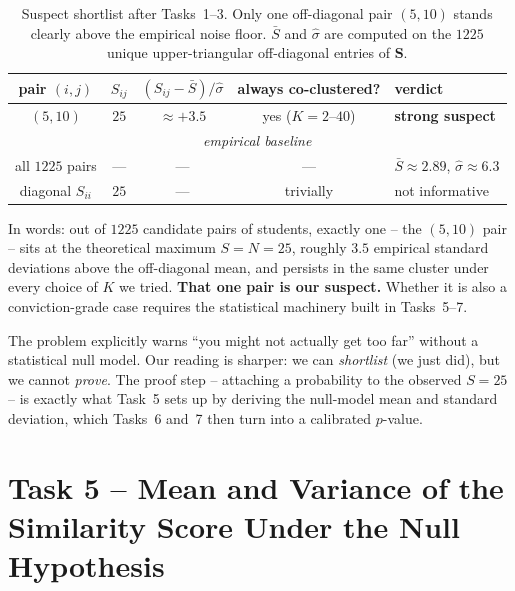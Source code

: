 \documentclass[11pt,a4paper]{article}
\newcommand{\Sm}{\bm{S}}
\begin{document}
\begin{table}[htb]
  \centering
  \begin{tabular}{c c c c l}
    \toprule
    pair $(i,j)$ & $S_{ij}$ & $(S_{ij}-\bar S)/\hat\sigma$ &
        always co-clustered? & verdict \\
    \midrule
    $(5,10)$ & $25$ & $\approx +3.5$ & yes ($K=2$--$40$) & \textbf{strong suspect} \\
    \multicolumn{5}{c}{\emph{empirical baseline}}\\
    all $1225$ pairs & --- & --- & --- &
        $\bar S \approx 2.89$, $\hat\sigma \approx 6.3$ \\
    diagonal $S_{ii}$ & $25$ & --- & trivially & not informative \\
    \bottomrule
  \end{tabular}
  \caption{Suspect shortlist after Tasks~1--3. Only one off-diagonal
  pair $(5,10)$ stands clearly above the empirical noise floor.
  $\bar S$ and $\hat\sigma$ are computed on the $1225$ unique
  upper-triangular off-diagonal entries of $\Sm$.}
  \label{tab:suspects}
\end{table}

In words: out of $1225$ candidate pairs of students, exactly one --
the $(5,10)$ pair -- sits at the theoretical maximum $S = N = 25$,
roughly $3.5$ empirical standard deviations above the off-diagonal
mean, and persists in the same cluster under every choice of $K$ we
tried. \textbf{That one pair is our suspect.} Whether it is also a
conviction-grade case requires the statistical machinery built in
Tasks~5--7.

\begin{insight}
The problem explicitly warns ``you might not actually get too far''
without a statistical null model. Our reading is sharper: we can
\emph{shortlist} (we just did), but we cannot \emph{prove}. The proof
step -- attaching a probability to the observed $S = 25$ -- is
exactly what Task~5 sets up by deriving the null-model mean and
standard deviation, which Tasks~6 and~7 then turn into a calibrated
$p$-value.
\end{insight}

\section{Task 5 -- Mean and Variance of the Similarity Score
                    Under the Null Hypothesis}
\end{document}
